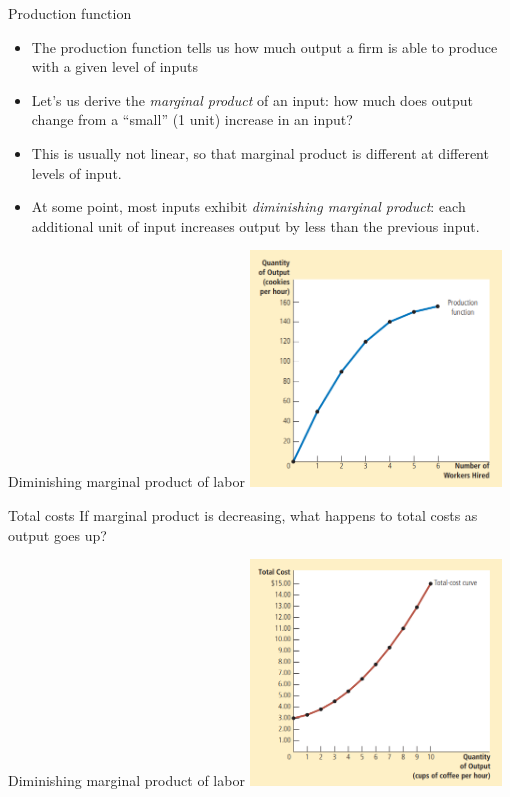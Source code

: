\documentclass[aspectratio=169]{beamer}
\begin{document}
\begin{frame}{Production function}
    \begin{itemize}
        \item The production function tells us how much output a firm is able to produce with a given level of inputs
        \item Let's us derive the \textit{marginal product} of an input: how much does output change from a ``small'' (1 unit) increase in an input?
        \item This is usually not linear, so that marginal product is different at different levels of input.
        \item At some point, most inputs exhibit \textit{diminishing marginal product}: each additional unit of input increases output by less than the previous input.
    \end{itemize}
\end{frame}

\begin{frame}{Diminishing marginal product of labor}
    \centering
    \includegraphics[width = 0.5\textwidth,keepaspectratio]{diminishingMPL.png}
\end{frame}

\begin{frame}{Total costs}
    If marginal product is decreasing, what happens to total costs as output goes up?
\end{frame}

\begin{frame}{Diminishing marginal product of labor}
    \centering
    \includegraphics[width = 0.5\textwidth,keepaspectratio]{increasingTC.png}
\end{frame}
\end{document}
